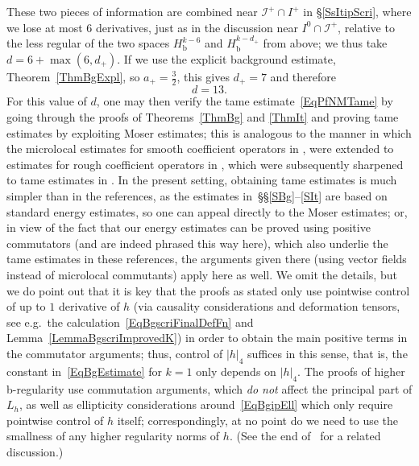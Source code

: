 \documentclass[reqno,11pt,letterpaper]{amsart}
\numberwithin{equation}{section}
\numberwithin{figure}{section}
\theoremstyle{definition}
\theoremstyle{remark}
\newcommand{\ms}{\mathscr}
\newcommand{\scri}{\ms I}
\newcommand{\bop}{{\mathrm{b}}}
\newcommand{\Hb}{H_{\bop}}
\begin{document}
These two pieces of information are combined near $\scri^+\cap I^+$ in \S\ref{SsItipScri}, where we lose at most $6$ derivatives, just as in the discussion near $I^0\cap\scri^+$, relative to the less regular of the two spaces $\Hb^{k-6}$ and $\Hb^{k-d_+}$ from above; we thus take $d=6+\max(6,d_+)$. If we use the explicit background estimate, Theorem~\ref{ThmBgExpl}, so $a_+=\tfrac32$, this gives $d_+=7$ and therefore
\[
  d=13.
\]
For this value of $d$, one may then verify the tame estimate~\eqref{EqPfNMTame} by going through the proofs of Theorems~\ref{ThmBg} and \ref{ThmIt} and proving tame estimates by exploiting Moser estimates; this is analogous to the manner in which the microlocal estimates for smooth coefficient operators in \cite[\S2]{VasyMicroKerrdS}, \cite[\S2.1]{HintzVasySemilinear} were extended to estimates for rough coefficient operators in \cite[\S\S3--6]{HintzQuasilinearDS}, which were subsequently sharpened to tame estimates in \cite[\S\S3--4]{HintzVasyQuasilinearKdS}. In the present setting, obtaining tame estimates is much simpler than in the references, as the estimates in~\S\S\ref{SBg}--\ref{SIt} are based on standard energy estimates, so one can appeal directly to the Moser estimates; or, in view of the fact that our energy estimates can be proved using positive commutators (and are indeed phrased this way here), which also underlie the tame estimates in these references, the arguments given there (using vector fields instead of microlocal commutants) apply here as well. We omit the details, but we do point out that it is key that the proofs as stated only use pointwise control of up to $1$ derivative of $h$ (via causality considerations and deformation tensors, see e.g.\ the calculation~\eqref{EqBgscriFinalDefFn} and Lemma~\ref{LemmaBgscriImprovedK}) in order to obtain the main positive terms in the commutator arguments; thus, control of $|h|_4$ suffices in this sense, that is, the constant in~\eqref{EqBgEstimate} for $k=1$ only depends on $|h|_4$. The proofs of higher b-regularity use commutation arguments, which \emph{do not} affect the principal part of $L_h$, as well as ellipticity considerations around~\eqref{EqBgipEll} which only require pointwise control of $h$ itself; correspondingly, at no point do we need to use the smallness of any higher regularity norms of $h$. (See the end of~\cite[\S6.4]{HormanderNonlinearLectures} for a related discussion.)
\end{document}
